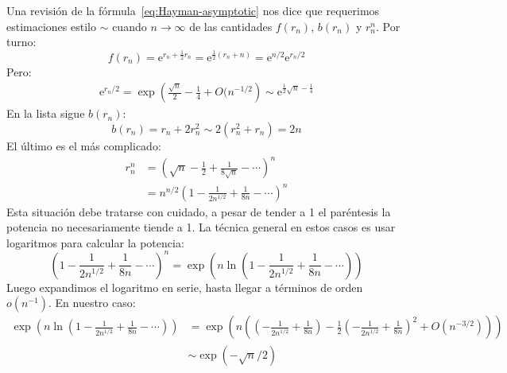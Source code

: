   Una revisión de la fórmula~\eqref{eq:Hayman-asymptotic} nos dice
  que requerimos estimaciones
  estilo \(\sim\) cuando \(n \rightarrow \infty\)
  de las cantidades \(f(r_n)\), \(b(r_n)\) y \(r_n^n\).
  Por turno:
  \begin{equation*}
    f(r_n)
      = \mathrm{e}^{r_n + \frac{1}{2} r_n}
      = \mathrm{e}^{\frac{1}{2} (r_n + n)}
      = \mathrm{e}^{n/2} \mathrm{e}^{r_n / 2}
  \end{equation*}
  Pero:
  \begin{align*}
    \mathrm{e}^{r_n / 2}
      = \exp \left(
		\frac{\sqrt{n}}{2} - \frac{1}{4} + O(n^{-1/2}
	      \right)
      \sim \mathrm{e}^{\frac{1}{2} \sqrt{n} - \frac{1}{4}}
  \end{align*}
  En la lista sigue \(b(r_n)\):
  \begin{equation*}
    b(r_n)
      = r_n + 2 r_n^2
      \sim 2 (r_n^2 + r_n)
      = 2 n
  \end{equation*}
  El último es el más complicado:
  \begin{align*}
    r_n^n
      &= \left(
	   \sqrt{n} - \frac{1}{2} + \frac{1}{8 \sqrt{n}} - \dotsb
	 \right)^n \\
      &= n^{n/2}
	   \left(
	     1 - \frac{1}{2 n^{1/2}} + \frac{1}{8 n} - \dotsb
	   \right)^n
  \end{align*}
  Esta situación debe tratarse con cuidado,
  a pesar de tender a 1 el paréntesis
  la potencia no necesariamente tiende a 1.
  La técnica general en estos casos es usar logaritmos
  para calcular la potencia:
  \begin{equation*}
    \left(
      1 - \frac{1}{2 n^{1/2}} + \frac{1}{8 n} - \dotsb
    \right)^n
      = \exp \left( n \ln \left(
			    1 - \frac{1}{2 n^{1/2}}
			      + \frac{1}{8 n}
			      - \dotsb
			  \right)
	     \right)
  \end{equation*}
  Luego expandimos el logaritmo en serie,%
  hasta llegar a términos de orden \(o(n^{-1})\).
  En nuestro caso:
  \begin{align*}
    \exp \left( n \ln \left(
			1 - \frac{1}{2 n^{1/2}}
			  + \frac{1}{8 n}
			  - \dotsb
		      \right)
	 \right)
      &= \exp \left(
		n \left(
		    \left(
		      - \frac{1}{2 n^{1/2}} + \frac{1}{8 n}
		    \right)
		      - \frac{1}{2}
			  \left(
			    - \frac{1}{2 n^{1/2}} + \frac{1}{8 n}
			  \right)^2
		      + O(n^{-3/2})
		     \right)
		  \right) \\
      &\sim \exp(- \sqrt{n} / 2)
  \end{align*}

